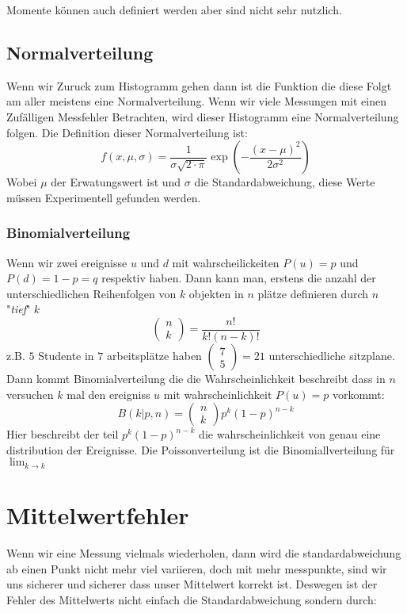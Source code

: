 \documentclass{article}
\begin{document}
Momente können auch definiert werden aber sind nicht sehr nutzlich.
\hypertarget{Normalverteilung}{\subsection*{Normalverteilung}}
Wenn wir Zuruck zum Histogramm gehen dann ist die Funktion die diese Folgt am aller meistens eine Normalverteilung. Wenn wir viele Messungen mit einen Zufälligen Messfehler Betrachten, wird dieser Histogramm eine Normalverteilung folgen.
Die Definition dieser Normalverteilung ist:
\[f(x,\mu,\sigma)=\frac{1}{\sigma\sqrt{2\cdot\pi}}\exp\left(-\frac{(x-\mu)^2}{2\sigma^2}\right)\]
Wobei $\mu$ der Erwatungswert ist und $\sigma$ die Standardabweichung, diese Werte müssen Experimentell gefunden werden.
\hypertarget{Binomialverteilung}{\subsubsection*{Binomialverteilung}}
Wenn wir zwei ereignisse $u$ und $d$ mit wahrscheilickeiten $P(u)=p$ und $P(d)=1-p=q$ respektiv haben. Dann kann man, erstens die anzahl der unterschiedlichen Reihenfolgen von $k$ objekten in $n$ plätze definieren durch $n$ "\textit{tief}" $k$\[\begin{pmatrix}n\\k\end{pmatrix}=\frac{n!}{k!(n-k)!}\] z.B. $5$ Studente in $7$ arbeitsplätze haben $\begin{pmatrix}7\\5\end{pmatrix}=21$ unterschiedliche sitzplane.
Dann kommt Binomialverteilung die die Wahrscheinlichkeit beschreibt dass in $n$ versuchen $k$ mal den ereigniss $u$ mit wahrscheinlichkeit $P(u)=p$ vorkommt:
\[B(k|p,n)=\begin{pmatrix}n\\k\end{pmatrix}p^k(1-p)^{n-k}\] Hier beschreibt der teil $p^k(1-p)^{n-k}$ die wahrscheinlichkeit von genau eine distribution der Ereignisse.
Die Poissonverteilung ist die Binomiallverteilung für $\lim_{k\rightarrow k}$
\hypertarget{mittelwertfehler}{\section*{Mittelwertfehler}}
Wenn wir eine Messung vielmals wiederholen, dann wird die standardabweichung ab einen Punkt nicht mehr viel variieren, doch mit mehr messpunkte, sind wir uns sicherer und sicherer dass unser Mittelwert korrekt ist. Deswegen ist der Fehler des Mittelwerts nicht einfach die Standardabweichung sondern durch:
\end{document}
